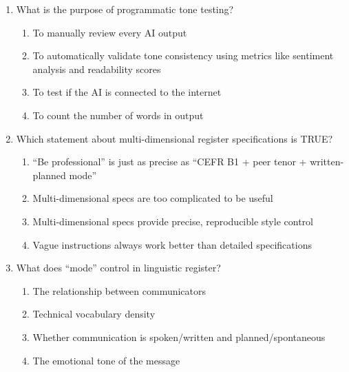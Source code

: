 \documentclass[11pt]{article}
\begin{document}
\begin{enumerate}
\item What is the purpose of programmatic tone testing?
\begin{enumerate}[label=\Alph*.]
    \item To manually review every AI output
    \item To automatically validate tone consistency using metrics like sentiment analysis and readability scores
    \item To test if the AI is connected to the internet
    \item To count the number of words in output
\end{enumerate}

\item Which statement about multi-dimensional register specifications is TRUE?
\begin{enumerate}[label=\Alph*.]
    \item ``Be professional'' is just as precise as ``CEFR B1 + peer tenor + written-planned mode''
    \item Multi-dimensional specs are too complicated to be useful
    \item Multi-dimensional specs provide precise, reproducible style control
    \item Vague instructions always work better than detailed specifications
\end{enumerate}

\item What does ``mode'' control in linguistic register?
\begin{enumerate}[label=\Alph*.]
    \item The relationship between communicators
    \item Technical vocabulary density
    \item Whether communication is spoken/written and planned/spontaneous
    \item The emotional tone of the message
\end{enumerate}

\end{enumerate}
\end{document}
